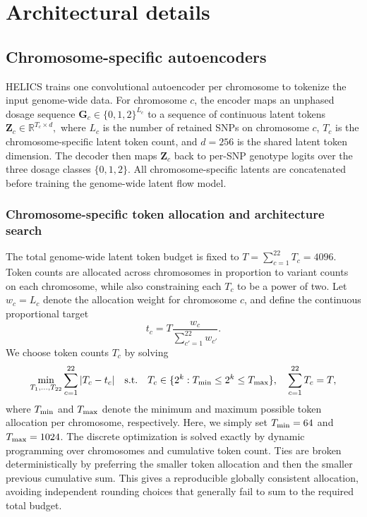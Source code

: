 \documentclass{article}
\begin{document}
\section{Architectural details}
\label{app:architecture-details}

\subsection{Chromosome-specific autoencoders}
\label{app:AEarchitecture-details}

HELICS trains one convolutional autoencoder per chromosome to tokenize the input genome-wide data. For chromosome \(c\), the encoder maps an unphased dosage sequence
\(
\boldsymbol G_c \in \{0,1,2\}^{L_c}
\)
to a sequence of continuous latent tokens
\(
\boldsymbol Z_c \in \mathbb R^{T_c \times d},
\)
where \(L_c\) is the number of retained SNPs on chromosome \(c\), \(T_c\) is the chromosome-specific latent token count, and \(d=256\) is the shared latent token dimension. The decoder then maps \(\boldsymbol Z_c\) back to per-SNP genotype logits over the three dosage classes \(\{0,1,2\}\). All chromosome-specific latents are concatenated before training the genome-wide latent flow model.

\subsubsection{Chromosome-specific token allocation and architecture search}

The total genome-wide latent token budget is fixed to
\(
T=\sum_{c=1}^{22}T_c=4096.
\)
Token counts are allocated across chromosomes in proportion to variant counts on each chromosome, while also constraining each \(T_c\) to be a power of two. Let \(w_c=L_c\) denote the allocation weight for chromosome \(c\), and define the continuous proportional target
\[
t_c = T \frac{w_c}{\sum_{c'=1}^{22} w_{c'}}.
\]
We choose token counts \(T_c\) by solving
\[
\min_{T_1,\ldots,T_{22}}
\sum_{c=1}^{22} |T_c-t_c|
\quad
\mathrm{s.t.}
\quad
T_c \in \{2^k:T_{\rm min}\le 2^k \le T_{\rm max}\},
\quad
\sum_{c=1}^{22}T_c=T,
\]
where $T_{\rm min}$ and $T_{\rm max}$ denote the minimum and maximum possible token allocation per chromosome, respectively. Here, we simply set \(T_{\rm min} = 64\) and \(T_{\rm max} = 1024\). The discrete optimization is solved exactly by dynamic programming over chromosomes and cumulative token count. Ties are broken deterministically by preferring the smaller token allocation and then the smaller previous cumulative sum. This gives a reproducible globally consistent allocation, avoiding independent rounding choices that generally fail to sum to the required total budget.
\end{document}
